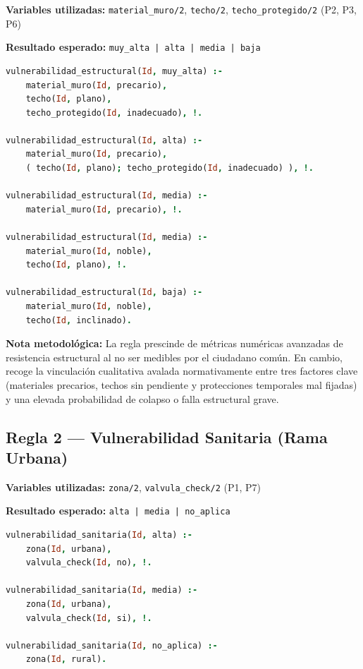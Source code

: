 \documentclass[12pt, letterpaper]{article}
\begin{document}
\textbf{Variables utilizadas:} \texttt{material\_muro/2}, \texttt{techo/2}, \texttt{techo\_protegido/2} (P2, P3, P6)

\textbf{Resultado esperado:} \texttt{muy\_alta | alta | media | baja}

\begin{lstlisting}[language=Prolog, caption={Reglas de vulnerabilidad estructural}]
  vulnerabilidad_estructural(Id, muy_alta) :-
    material_muro(Id, precario),
    techo(Id, plano),
    techo_protegido(Id, inadecuado), !.

vulnerabilidad_estructural(Id, alta) :-
    material_muro(Id, precario),
    ( techo(Id, plano); techo_protegido(Id, inadecuado) ), !.

vulnerabilidad_estructural(Id, media) :-
    material_muro(Id, precario), !.

vulnerabilidad_estructural(Id, media) :-
    material_muro(Id, noble),
    techo(Id, plano), !.

vulnerabilidad_estructural(Id, baja) :-
    material_muro(Id, noble),
    techo(Id, inclinado).
\end{lstlisting}

\textbf{Nota metodológica:} La regla prescinde de métricas numéricas avanzadas de resistencia estructural al no ser medibles por el ciudadano común. En cambio, recoge la vinculación cualitativa avalada normativamente entre tres factores clave (materiales precarios, techos sin pendiente y protecciones temporales mal fijadas) y una elevada probabilidad de colapso o falla estructural grave.

\subsection{Regla 2 — Vulnerabilidad Sanitaria (Rama Urbana)}

\textbf{Variables utilizadas:} \texttt{zona/2}, \texttt{valvula\_check/2} (P1, P7)

\textbf{Resultado esperado:} \texttt{alta | media | no\_aplica}

\begin{lstlisting}[language=Prolog, caption={Reglas de vulnerabilidad sanitaria}]
vulnerabilidad_sanitaria(Id, alta) :-
    zona(Id, urbana),
    valvula_check(Id, no), !.

vulnerabilidad_sanitaria(Id, media) :-
    zona(Id, urbana),
    valvula_check(Id, si), !.

vulnerabilidad_sanitaria(Id, no_aplica) :-
    zona(Id, rural).
\end{lstlisting}
\end{document}
